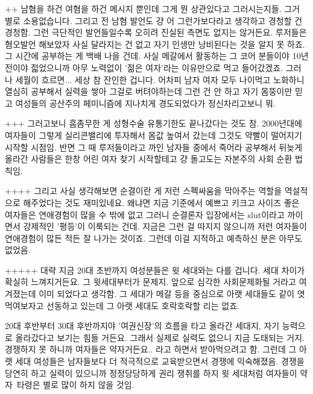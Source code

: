 ++
남혐을 하건 여혐을 하건 메시지 뿐인데 그게 뭔 상관있다고 그러시는지들.
그거 별로 소용없습니다. 그리고 전 남혐 발언도 걍 어 그런가보다라고 생각하고 경청할 건 경청함.
그런 극단적인 발언들일수록 오히려 진실된 측면도 없지는 않거든요.
루저들은 혐오발언 해보았자 사실 달라지는 건 없고 자기 인생만 낭비된다는 것을 알지 못 하죠. 그 시간에 공부하는 게 백배 나을 건데.
사실 메갈에서 활동하는 그 코어 분들이야 10년 전이야 젋었으니까 아무 노력없이 '젊은 여자'라는 이유만으로 먹고 들어갔겠죠.
그러나 세월이 흐르면... 세상 참 잔인한 겁니다.
어차피 남자 여자 모두 나이먹고 노화하니 열심히 공부해서 실력을 쌓아 그걸로 버텨야하는데
그런 건 안 하고 자기 몸뚱이만 믿고 여성들의 공산주의 페미니즘에 지나치게 경도되었다가 정신차리고보니 뭐.
\vspace{5mm}

+++
그러고보니 흠좀무한 게 성형수술 유통기한도 끝나갔다는 것도 참.
2000년대에 여자들이 그렇게 실리콘밸리에 투자해서 몸값 높여서 갔는데 그것도 약빨이 떨어지기 시작할 시점임.
반면 그 때 루저들이라고 까인 남자들 중에서 죽어라 공부해서 뒤늦게 올라간 사람들은 한창 어린 여자 찾기 시작할테고
걍 돌고도는 자본주의 사회 순환 법칙임.
\vspace{5mm}

++++
그리고 사실 생각해보면 순결이란 게 저런 스펙싸움을 막아주는 역할을 역설적으로 해주었다는 것도 재미있네요.
왜냐면 지금 기준에서 예쁘고 키크고 사이즈 좋은 여자들은 연애경험이 많을 수 밖에 없고 그러니
순결론자 입장에서는 slut이라고 까이면서 강제적인 '평등'이 이룩되는 건데.
지금은 그런 걸 따지지 않으니까 저런 여자들이 연애경험이 많든 적든 잘 나가는 것이죠.
그런데 이걸 지적하고 예측하신 분은 아무도 없었음.
\vspace{5mm}

+++++
대략 지금 20대 초반까지 여성분들은 윗 세대와는 다를 겁니다. 세대 차이가 확실히 느껴지거든요.
그 윗세대부터가 문제지. 앞으로 심각한 사회문제화될 거라고 여겨졌는데 이미 되었다고 생각함.
그 세대가 메갈 등을 중심으로 아랫 세대들도 같이 엿먹여보자고 선동하고 있는데 그 아랫 세대도 호락호락할 리는 없죠.
\vspace{5mm}

20대 후반부터 30대 후반까지야 '여권신장'의 흐름을 타고 올라간 세대지, 자기 능력으로 올라갔다고 보기는 힘들 거든요.
그래서 실제로 실력도 없으니 지금 도태되는 거지. 경쟁하지 못 하니까 여자들은 약자거든요.. 라고 하면서 받아먹으려고 함.
그런데 그 아랫 세대 여성들은 남자들보다 더 적극적으로 교육받으면서 경쟁에 익숙해졌음.
경쟁을 당연히 하고 실력이 있으니까 정정당당하게 권리 쟁취를 하지 윗 세대처럼 여자들이 약자 타령은 별로 많이 하지 않을 것임.
\vspace{5mm}

